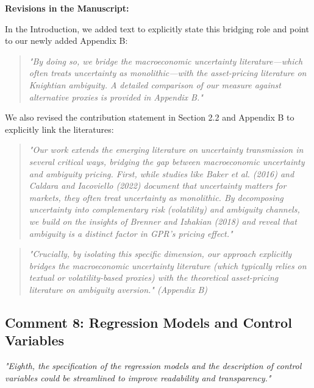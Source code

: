 \documentclass[12pt]{article}
\begin{document}
\begin{highlightbox}
\textbf{Revisions in the Manuscript:}

In the Introduction, we added text to explicitly state this bridging role and point to our newly added Appendix B:
\vspace{0.2cm}
\begin{quote}
\color{red}\itshape "By doing so, we bridge the macroeconomic uncertainty literature---which often treats uncertainty as monolithic---with the asset-pricing literature on Knightian ambiguity. A detailed comparison of our measure against alternative proxies is provided in Appendix B."
\end{quote}
\vspace{0.2cm}

We also revised the contribution statement in Section 2.2 and Appendix B to explicitly link the literatures:
\vspace{0.2cm}
\begin{quote}
\color{red}\itshape "Our work extends the emerging literature on uncertainty transmission in several critical ways, bridging the gap between macroeconomic uncertainty and ambiguity pricing. First, while studies like Baker et al. (2016) and Caldara and Iacoviello (2022) document that uncertainty matters for markets, they often treat uncertainty as monolithic. By decomposing uncertainty into complementary risk (volatility) and ambiguity channels, we build on the insights of Brenner and Izhakian (2018) and reveal that ambiguity is a distinct factor in GPR's pricing effect."
\end{quote}

\begin{quote}
\color{red}\itshape "Crucially, by isolating this specific dimension, our approach explicitly bridges the macroeconomic uncertainty literature (which typically relies on textual or volatility-based proxies) with the theoretical asset-pricing literature on ambiguity aversion." (Appendix B)
\end{quote}
\end{highlightbox}

\subsection*{Comment 8: Regression Models and Control Variables}
\textit{"Eighth, the specification of the regression models and the description of control variables could be streamlined to improve readability and transparency."}
\end{document}
